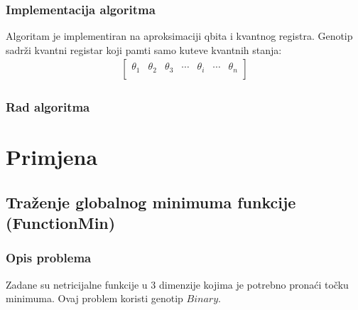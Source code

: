 \documentclass[times, utf8, zavrsni]{fer}
\begin{document}
\subsection{Implementacija algoritma}
Algoritam je implementiran na aproksimaciji qbita i kvantnog registra. Genotip sadrži kvantni registar koji pamti samo kuteve kvantnih stanja:
\begin{align*}
\begin{bmatrix}
\theta_1 & \theta_2 & \theta_3 & \cdots & \theta_i & \cdots & \theta_n \\
\end{bmatrix}
\end{align*}

\paragraph{}



\subsection{Rad algoritma}



\chapter{Primjena}

\section{Traženje globalnog minimuma funkcije (FunctionMin)}
\subsection{Opis problema}
Zadane su netricijalne funkcije u 3 dimenzije kojima je potrebno pronaći točku minimuma.
Ovaj problem koristi genotip $Binary$.
\end{document}
